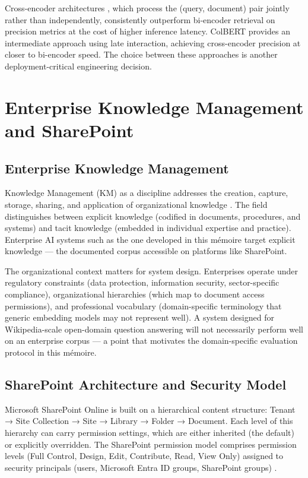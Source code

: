 Cross-encoder architectures \citep{Nogueira2019}, which process the (query, document) pair jointly rather than independently, consistently outperform bi-encoder retrieval on precision metrics at the cost of higher inference latency. ColBERT \citep{Khattab2020} provides an intermediate approach using late interaction, achieving cross-encoder precision at closer to bi-encoder speed. The choice between these approaches is another deployment-critical engineering decision.

\section{Enterprise Knowledge Management and SharePoint}
\label{sec:bg-enterprise}

\subsection{Enterprise Knowledge Management}

Knowledge Management (KM) as a discipline addresses the creation, capture, storage, sharing, and application of organizational knowledge \citep{Alavi2001}. The field distinguishes between explicit knowledge (codified in documents, procedures, and systems) and tacit knowledge (embedded in individual expertise and practice). Enterprise AI systems such as the one developed in this mémoire target explicit knowledge — the documented corpus accessible on platforms like SharePoint.

The organizational context matters for system design. Enterprises operate under regulatory constraints (data protection, information security, sector-specific compliance), organizational hierarchies (which map to document access permissions), and professional vocabulary (domain-specific terminology that generic embedding models may not represent well). A system designed for Wikipedia-scale open-domain question answering will not necessarily perform well on an enterprise corpus — a point that motivates the domain-specific evaluation protocol in this mémoire.

\subsection{SharePoint Architecture and Security Model}

Microsoft SharePoint Online is built on a hierarchical content structure: Tenant → Site Collection → Site → Library → Folder → Document. Each level of this hierarchy can carry permission settings, which are either inherited (the default) or explicitly overridden. The SharePoint permission model comprises permission levels (Full Control, Design, Edit, Contribute, Read, View Only) assigned to security principals (users, Microsoft Entra ID groups, SharePoint groups) \citep{Microsoft2024}.

